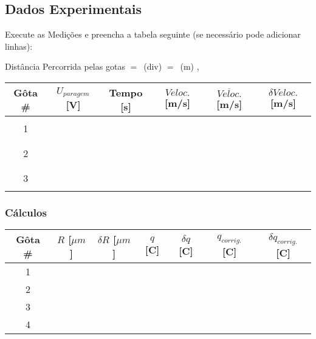 \documentclass[a4paper,12pt]{article}  %
\begin{document}
\subsection{\sf Dados Experimentais}

 Execute as Medições e preencha a tabela seguinte (se necessário pode adicionar linhas):

\noindent  Distância Percorrida pelas gotas $=$~\underline{\makebox[1cm][r]{~}}(div) $=$~\underline{\makebox[1cm][r]{~}}(m) , 

\begin{center}
	\begin{tabular}{|c|c|c|c|c|c|}
	\hline
	Gôta \#  & $U_{paragem}$ [V] & Tempo [s] & $Veloc.$  [m/s]& $\overline{Veloc.}$ [m/s]	& $\delta Veloc.$ [m/s]  \\
	\hline
	  &  &  & &  & \\ \cline{2-4}
	1 &  & & &  & \\ \cline{2-4}
	  &  &  & &  & \\  \hline
	  &  &  & &  & \\ \cline{2-4}
	2 &  & & &  & \\ \cline{2-4}
	  &  &  & &  & \\ \hline
	  &  &  & &  & \\ \cline{2-4}
	3 &  & & &  & \\ \cline{2-4}
	  &  &  & &  & \\ \hline
 	\end{tabular}
\end{center}

\vspace{4cm}

\subsubsection{\sf Cálculos}

\begin{center}
	\renewcommand{\arraystretch}{1.5}
	\begin{tabular}{|c|c|c|c|c|c|c|}
	\hline
	Gôta \#  & $R$ [$\mu m$] & $\delta R$  [$\mu m$] & $q$ [C] & $\delta q$ [C] & $q_{corrig.}$ [C] & $\delta q_{corrig.}$ [C] \\ \hline
	 1 & &  &  & &  &  \\ \hline
	 2 & &  &  & &  & \\ \hline
	 3 & &  &  & &  & \\ \hline
	 4 & &  &  & &  & \\ \hline
 	\end{tabular}
\end{center}
\end{document}

